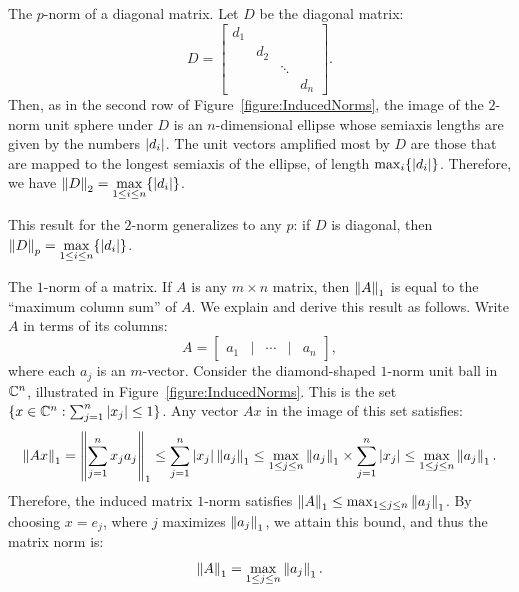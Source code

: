 \begin{example}\label{example:diagonalpnorm}
The $p$-norm of a diagonal matrix. Let $D$ be the diagonal matrix:
\begin{equation}
D = \begin{bmatrix} d_1\\ &d_2\\&&\ddots\\&&&d_n\end{bmatrix}.
\end{equation}
Then, as in the second row of Figure~\ref{figure:InducedNorms}, the image of the $2$-norm unit sphere under $D$ is an $n$-dimensional ellipse whose semiaxis lengths are given by the numbers $\left|{d_i}\right|$. The unit vectors amplified most by $D$ are those that are mapped to the longest semiaxis of the ellipse, of length $\max_i\{\left|{d_i}\right|\}$. Therefore, we have $\displaystyle \left\|{D}\right\|_2 = \max_{1\le i\le n}\{\left|{d_i}\right|\}$.

This result for the $2$-norm generalizes to any $p$: if $D$ is diagonal, then $\displaystyle \left\|{D}\right\|_p = \max_{1\le i\le n}\{\left|{d_i}\right|\}$.
\end{example}

\begin{example}
The $1$-norm of a matrix. If $A$ is any $m\times n$ matrix, then $\left\|{A}\right\|_1$ is equal to the ``maximum column sum'' of $A$. We explain and derive this result as follows. Write $A$ in terms of its columns:
\begin{equation}
A = \begin{bmatrix} a_1 & \Bigg| & \cdots & \Bigg| & a_n\end{bmatrix},
\end{equation}
where each $a_j$ is an $m$-vector. Consider the diamond-shaped $1$-norm unit ball in $\mathbb{C}^n$, illustrated in Figure~\ref{figure:InducedNorms}. This is the set $\{x\in\mathbb{C}^n:\sum_{j=1}^n\left|{x_j}\right| \le 1\}$. Any vector $Ax$ in the image of this set satisfies:
\begin{equation}
\left\|{Ax}\right\|_1 = \left\|{\sum_{j=1}^nx_ja_j}\right\|_1 \le \sum_{j=1}^n\left|{x_j}\right|\left\|{a_j}\right\|_1 \le \max_{1\le j\le n}\left\|{a_j}\right\|_1\times \sum_{j=1}^n\left|{x_j}\right| \le \max_{1\le j\le n}\left\|{a_j}\right\|_1.
\end{equation}
Therefore, the induced matrix $1$-norm satisfies $\left\|{A}\right\|_1 \le \max_{1\le j\le n}\left\|{a_j}\right\|_1$. By choosing $x=e_j$, where $j$ maximizes $\left\|{a_j}\right\|_1$, we attain this bound, and thus the matrix norm is:
\begin{equation}
\left\|{A}\right\|_1 = \max_{1\le j\le n}\left\|{a_j}\right\|_1.
\end{equation}
\end{example}

